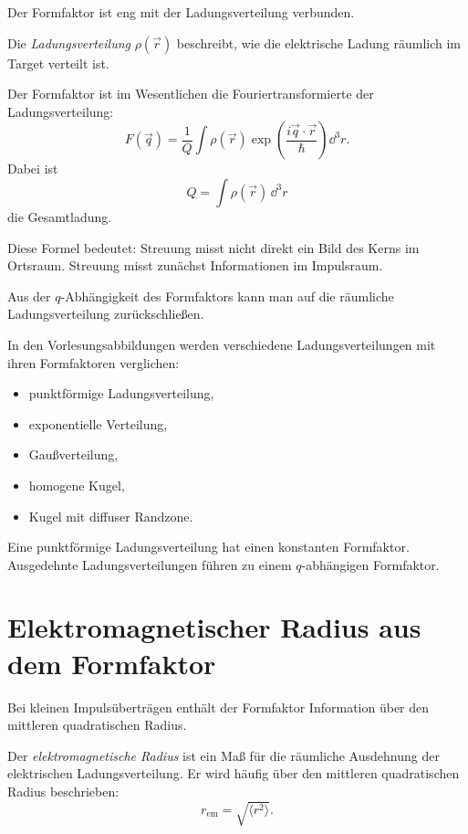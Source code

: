 Der Formfaktor ist eng mit der Ladungsverteilung verbunden.

\begin{definitionbox}
Die \emph{Ladungsverteilung} $\rho(\vec r)$ beschreibt, wie die elektrische Ladung
räumlich im Target verteilt ist.
\end{definitionbox}

\begin{formulabox}
Der Formfaktor ist im Wesentlichen die Fouriertransformierte der Ladungsverteilung:
\[
    F(\vec q)
    =
    \frac{1}{Q}
    \int \rho(\vec r)
    \exp\left(
        \frac{i\vec q\cdot\vec r}{\hbar}
    \right)
    \dd^3 r.
\]
Dabei ist
\[
    Q=\int \rho(\vec r)\,\dd^3 r
\]
die Gesamtladung.
\end{formulabox}

\begin{conceptbox}
Diese Formel bedeutet:
Streuung misst nicht direkt ein Bild des Kerns im Ortsraum.
Streuung misst zunächst Informationen im Impulsraum.

Aus der $q$-Abhängigkeit des Formfaktors kann man auf die räumliche Ladungsverteilung
zurückschließen.
\end{conceptbox}

\begin{notebox}
In den Vorlesungsabbildungen werden verschiedene Ladungsverteilungen mit ihren
Formfaktoren verglichen:
\begin{itemize}
    \item punktförmige Ladungsverteilung,
    \item exponentielle Verteilung,
    \item Gaußverteilung,
    \item homogene Kugel,
    \item Kugel mit diffuser Randzone.
\end{itemize}
Eine punktförmige Ladungsverteilung hat einen konstanten Formfaktor.
Ausgedehnte Ladungsverteilungen führen zu einem $q$-abhängigen Formfaktor.
\end{notebox}

\section{Elektromagnetischer Radius aus dem Formfaktor}

Bei kleinen Impulsüberträgen enthält der Formfaktor Information über den mittleren
quadratischen Radius.

\begin{definitionbox}
Der \emph{elektromagnetische Radius} ist ein Maß für die räumliche Ausdehnung der
elektrischen Ladungsverteilung.
Er wird häufig über den mittleren quadratischen Radius beschrieben:
\[
    r_{\mathrm{em}}
    =
    \sqrt{\langle r^2\rangle}.
\]
\end{definitionbox}

